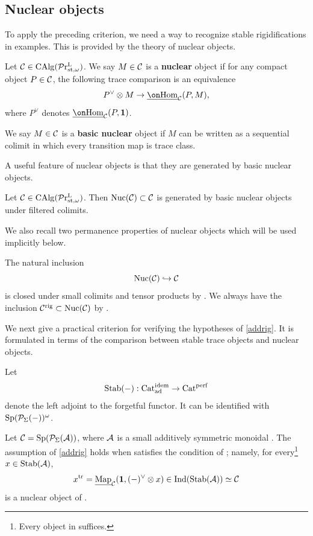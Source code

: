 \documentclass[a4paper,10pt, oneside]{amsart}
\begin{document}
\subsection{Nuclear objects}	To apply the preceding criterion, we need a way to recognize stable rigidifications in examples. This is provided by the theory of nuclear objects.
	\begin{de}

		Let $\mathcal{C}\in \operatorname{CAlg}(\mathcal{P}\mathrm{r}^\mathrm{L}_{\mathrm{st},\omega})$. We say $M\in \mathcal{C}$ is a \textbf{nuclear} object if for any compact object $P\in \mathcal{C}$, the following trace comparison is an equivalence 
		$$P^\vee \otimes M\to \underline{\Hom}_{\mcc}(P,M), $$  where $P^\vee$ denotes $\underline{\Hom}_{\mcc}(P,\mb{1})$.
		
We say $M\in \mathcal{C}$ is a \textbf{basic nuclear} object if $M$ can be written as a sequential colimit in which every transition map is trace class.
	\end{de}
	A useful feature of nuclear objects is that they are generated by basic nuclear objects.
	\begin{prop}\label{basicnucgen}
		Let $\mathcal{C}\in \operatorname{CAlg}(\mathcal{P}\mathrm{r}^\mathrm{L}_{\mathrm{st},\omega})$. Then $\mathrm{Nuc}(\mathcal{C})\subset \mathcal{C}$ is generated by basic nuclear objects under filtered colimits.
	\end{prop}
	We also recall two permanence properties of nuclear objects which will be used implicitly below.
	\begin{rem}
		The natural inclusion $$\mathrm{Nuc}(\mathcal{C})\hookrightarrow\mathcal{C}$$  is closed under small colimits and tensor products by \cite[Theorem 8.6]{clausen2026condensed}. We always have the inclusion $\mathcal{C}^{\mathrm{rig}}\subset \mathrm{Nuc}(\mathcal{C})$ by \cite[Proposition 1.27]{efimov2025localizinginvariantsinverselimits}.
	\end{rem}
We next give a practical criterion for verifying the hypotheses of \cref{addrig}. It is formulated in terms of the comparison between stable trace objects and nuclear objects.
\begin{de}\label{destab}
	Let $$\mathrm{Stab}(-):\mathrm{Cat}_{\mathrm{ad}}^{\mathrm{idem}}\to\mathrm{Cat}^{\mathrm{perf}}$$ denote the left adjoint to the forgetful functor. It can be identified with $\mathrm{Sp}(\mathcal{P}_{\Sigma}(-))^\omega$.
\end{de}
	\begin{prop}\label{addrigcriterion} 
		Let $\mathcal{C}=\mathrm{Sp}(\mathcal{P}_{\Sigma}(\mathcal{A}))$, where $\mathcal{A}$ is a small additively symmetric monoidal \infcat. The assumption of \cref{addrig} holds when \mcc satisfies the condition of \cite[Proposition 1.30]{efimov2025localizinginvariantsinverselimits}; namely, for every\footnote{Every object in \mca suffices.} $x\in \mathrm{Stab}(\mathcal{A})$,
		$$
		x^{\mathrm{tr}}=\underline{\operatorname{Map}}_{\mathcal{C}}(\mathbf{1},(-)^\vee\otimes x)\in \mathrm{Ind}(\mathrm{Stab}(\mathcal{A}))\simeq \mathcal{C}
		$$
		is a nuclear object of \mcc.
	\end{prop}
\end{document}
